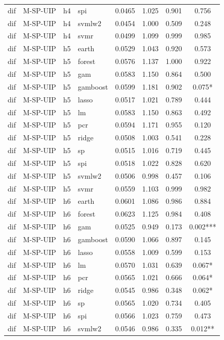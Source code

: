 \begin{ThreePartTable}
\begin{longtable}[t]{llclcccc}
dif & M-SP-UIP & h4 & spi & 0.0465 & 1.025 & 0.901 & 0.756\\
dif & M-SP-UIP & h4 & svmlw2 & 0.0454 & 1.000 & 0.509 & 0.248\\
dif & M-SP-UIP & h4 & svmr & 0.0499 & 1.099 & 0.999 & 0.985\\
\addlinespace
dif & M-SP-UIP & h5 & earth & 0.0529 & 1.043 & 0.920 & 0.573\\
dif & M-SP-UIP & h5 & forest & 0.0576 & 1.137 & 1.000 & 0.922\\
dif & M-SP-UIP & h5 & gam & 0.0583 & 1.150 & 0.864 & 0.500\\
dif & M-SP-UIP & h5 & gamboost & 0.0599 & 1.181 & 0.902 & 0.075*\\
dif & M-SP-UIP & h5 & lasso & 0.0517 & 1.021 & 0.789 & 0.444\\
dif & M-SP-UIP & h5 & lm & 0.0583 & 1.150 & 0.863 & 0.492\\
dif & M-SP-UIP & h5 & pcr & 0.0594 & 1.171 & 0.955 & 0.120\\
dif & M-SP-UIP & h5 & ridge & 0.0508 & 1.003 & 0.541 & 0.228\\
dif & M-SP-UIP & h5 & sp & 0.0515 & 1.016 & 0.719 & 0.445\\
dif & M-SP-UIP & h5 & spi & 0.0518 & 1.022 & 0.828 & 0.620\\
dif & M-SP-UIP & h5 & svmlw2 & 0.0506 & 0.998 & 0.457 & 0.106\\
dif & M-SP-UIP & h5 & svmr & 0.0559 & 1.103 & 0.999 & 0.982\\
\addlinespace
dif & M-SP-UIP & h6 & earth & 0.0601 & 1.086 & 0.986 & 0.884\\
dif & M-SP-UIP & h6 & forest & 0.0623 & 1.125 & 0.984 & 0.408\\
dif & M-SP-UIP & h6 & gam & 0.0525 & 0.949 & 0.173 & 0.002***\\
dif & M-SP-UIP & h6 & gamboost & 0.0590 & 1.066 & 0.897 & 0.145\\
dif & M-SP-UIP & h6 & lasso & 0.0558 & 1.009 & 0.599 & 0.153\\
dif & M-SP-UIP & h6 & lm & 0.0570 & 1.031 & 0.639 & 0.067*\\
dif & M-SP-UIP & h6 & pcr & 0.0565 & 1.021 & 0.666 & 0.064*\\
dif & M-SP-UIP & h6 & ridge & 0.0545 & 0.986 & 0.348 & 0.062*\\
dif & M-SP-UIP & h6 & sp & 0.0565 & 1.020 & 0.734 & 0.405\\
dif & M-SP-UIP & h6 & spi & 0.0566 & 1.023 & 0.759 & 0.473\\
dif & M-SP-UIP & h6 & svmlw2 & 0.0546 & 0.986 & 0.335 & 0.012**\\

\end{longtable}
\end{ThreePartTable}
